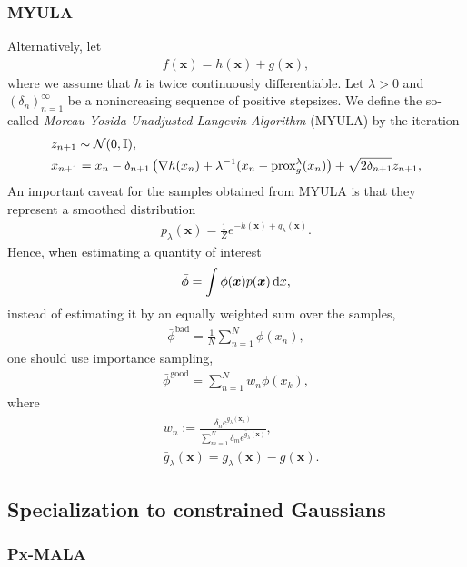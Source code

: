 \documentclass[10pt]{article}
\numberwithin{equation}{section}
\begin{document}
\subsubsection{MYULA}

Alternatively, let
\begin{align*}
f(\bm x) = h(\bm x) + g(\bm x),
\end{align*}
where we assume that $h$ is twice continuously differentiable. Let $\lambda > 0$ and $(\delta_n)_{n=1}^\infty$ be a nonincreasing sequence of positive stepsizes. We define the so-called \emph{Moreau-Yosida Unadjusted Langevin Algorithm} (MYULA) by the iteration
\begin{align*}
& z_{n+1} \sim \mathcal{N}(0, \mathbb{I}), \\
& x_{n+1} = x_n - \delta_{n+1} \left(\nabla h(x_n) + \lambda^{-1}(x_n - \text{prox}_{g}^{\lambda}(x_n) \right) + \sqrt{2 \delta_{n+1}} z_{n+1}, \\
\end{align*}
An important caveat for the samples obtained from MYULA is that they represent a smoothed distribution
\begin{align*}
p_\lambda(\bm x) = \frac{1}{Z} e^{-h(\bm x) + g_\lambda(\bm x)}.
\end{align*}
Hence, when estimating a quantity of interest
\begin{align*}
\bar \phi = \int \phi(\bm x) p(\bm x) \,\mathrm d x,
\end{align*}
instead of estimating it by an equally weighted sum over the samples,
\begin{align*}
\bar \phi^\text{bad} = \frac{1}{N} \sum_{n=1}^N \phi(x_n),
\end{align*}
one should use importance sampling,
\begin{align*}
\bar \phi^\text{good} = \sum_{n=1}^N w_n \phi(x_k),
\end{align*}
where
\begin{align*}
& w_n := \frac{\delta_n e^{\bar g_\lambda(\bm x_n)}}{\sum_{m=1}^N \delta_m e^{\bar g_\lambda(\bm x)}}, \\
& \bar g_\lambda(\bm x) = g_\lambda(\bm x) - g(\bm x).
\end{align*}

\subsection{Specialization to constrained Gaussians}

\subsubsection{Px-MALA}
\end{document}
